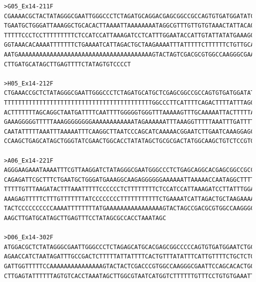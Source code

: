 \begin{verbatim}
>G05_Ex14-211F
CGAAAACGCTACTATAGGGCGAATTGGGCCCTCTAGATGCAGGACGAGCGGCCGCCAGTGTGATGGATATCTGCAGAAAAGCCCTTACCAGGGAGGCTTTGAATTCAGAGATTCGCTTTC
TGAATGCTGGGATTAAAGGCTGCACACTTAAAATTAAAAAAAATAGGCGTTTGTTGTGTAAACTATTACAGGATAAATAATAAGTGCAACTGTTATATTATTATTTAAGATACTTTAAAT
TTTTTCCCTCCTTTTTTTTTCTCCATCCATTAAAGATCCTCATTTGGAATACCATTGTATTATATGAAAGGGGCCAGTAATAAATGTTTTTCTTTTTAAAGAGTTTTTTTTGCATATGAG
GGTAAACACAAAATTTTTTTCTGAAAATCATTAGACTGCTAAGAAAATTTATTTTTCTTTTTTCTGTTGCAGCATGTGAATTCGCTTTCAGCTATTTTTTTTCCTACATAAAAGTTTGAA
AATGAAAAAAAAAAAAAAAAAAAAAAAAAAAAAAAAAAAAAAGTACTAGTCGACGCGTGGCCAAGGGCGAATTCCAGCACACTGGCGGCCGTTACTAGTGGATCCCAGCTCGGTACCAAG
CTTGATGCATAGCTTGAGTTTTCTATAGTGTCCCCT

>H05_Ex14-212F
CTGAAACCGCTCTATAGGGCGAATTGGGCCCTCTAGATGCATGCTCGAGCGGCCGCCAGTGTGATGGATATCTGCAGAATTCGCCCTTGGCCACGCGTCGACTAGTACTTTTTTTTTTTT
TTTTTTTTTTTTTTTTTTTTTTTTTTTTTTTTTTTTTTTTTTGGCCCTTCATTTTCAGACTTTTATTTAGGGGGGAAAAGCTGAAAGCGGCTTCACATGCTGGAACAGTTTATGTTCTTT
ACTTTTTTTAGCAGGCTAATGATTTTCAATTTTGGGGGTGGGTTTAAAAAGTTTGCAAAAATTACTTTTTAAAGGGGTACATTTTTTACTGGGCCCTTTCATATAAAACAATGGGGGTGG
GAAAGGGGGTTTTTAAAGGGGGGGGAAAAAAAAAAAATAGAAAAAATTTAAAGGTTTTTAAATTTGATTTTACAGTTGCAATTATTATTTATCCCGTGATAGTTTACCAAACCCCACCCC
CAATATTTTTAAATTTAAAAATTTCAAGGCTTAATCCCAGCATCAAAAACGGAATCTTGAATCAAAGGAGCTGGTAGGCCATTCCAGCCCTCTGCGGCCTGACAGTTGATCCGCGTCGCT
CCAAGCTGAGCATAGCTGGGTATCGAACTGGCACCTATATAGCTGCGCGACTATGGCAAGCTGTCTCCGTGCGGCATGTGTCATCGCC

>A06_Ex14-221F
AGGGAAGAAATAAAATTTCGTTAAGGATCTATAGGGCGAATGGGCCCTCTGAGCAGGCACGAGCGGCCGCCAGTGTGATGGATATGGGGAAAAAGAGAACTTACCAGGGAGGCTCGAATT
CAGAGATTCGCTTTCTGAATGCTGGGATGAAAGGCAAGAGGGGGGAAAAAATTAAAAACCAATAGGCTTTTTTTGTGCGTAAACTAGGTACAGGATAAATAATAAGTGCAACTGTTATAT
TTTTTGTTTAAGATACTTTAAATTTTTCCCCCCTCTTTTTTTTCTCCATCCATTAAAGATCCTTATTTGGAATACCATTGTATTATATGAAAGGGGCCAGTAATAAATGTTTTTTTTTTT
AAAGAGTTTTTCTTTGTTTTTTTATCCCCCCCCTTTTTTTTTTTCTGAAAATCATTAGACTGCTAAGAAAATTTAAGAATATTTTTTTGGGGGGGCATGTTTTAGTTTTTTTTCAGATAT
TACTCCCCCCCCCCAAAATTTTTTTTATGAAAAAAAAAAAAAAAAGTACTAGCCGACGCGTGGCCAAGGGCGAATTCCAGCCCACTGCCGGCCGCTACTAGTGGATCCGAGCTCGGTACC
AAGCTTGATGCATAGCTTGAGTTTCCTATAGCGCCACCTAAATAGC

>D06_Ex14-302F
ATGGACGCTCTATAGGGCGAATTGGGCCCTCTAGAGCATGCACGAGCGGCCCCCAGTGTGATGGAATCTGCAGAAAACGCCCTTCAGGCAAGGGTCTCTAAATCTGGTTTATCTTCTCAA
AGAACCATCTAATAGATTTGCCGACTCTTTTTATTATTTTCACTGTTTATATTTCATTGTTTTCTGCTCTGACTTTTATTATTTCTCATGATTGACTACATTATTTATTTAGTTTGTTTT
GATTGGTTTTTCCAAAAAAAAAAAAAAAGTACTACTCGACCCGTGGCCAAGGGCGAATTCCAGCACACTGGCGGCCGTTACTAGTGGTTTTTTTTCTCGGTTCCTTTTTTTTTTTCATAG
CTTGAGTATTTTTTAGTGTCACCTAAATAGCTTGGCGTAATCATGGTCTTTTTTGTTTCCTGTGTGAAATTGTTATCCGCTCACAATTCCTCACTATCTACAAGCCGGAAGCATAAACC


\end{verbatim}
